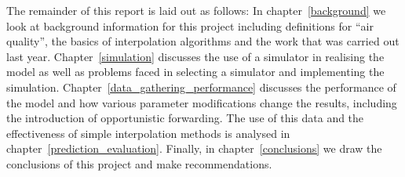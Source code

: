 
    The remainder of this report is laid out as follows: In chapter~\ref{background} we look at background information for this project including definitions for ``air quality'', the basics of interpolation algorithms and the work that was carried out last year. Chapter~\ref{simulation} discusses the use of a simulator in realising the model as well as problems faced in selecting a simulator and implementing the simulation. Chapter~\ref{data_gathering_performance} discusses the performance of the model and how various parameter modifications change the results, including the introduction of opportunistic forwarding. The use of this data and the effectiveness of simple interpolation methods is analysed in chapter~\ref{prediction_evaluation}. Finally, in chapter~\ref{conclusions} we draw the conclusions of this project and make recommendations.
